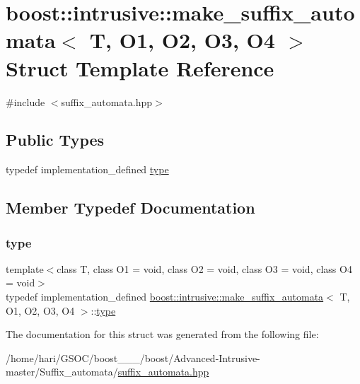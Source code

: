 \hypertarget{structboost_1_1intrusive_1_1make__suffix__automata}{}\section{boost\+:\+:intrusive\+:\+:make\+\_\+suffix\+\_\+automata$<$ T, O1, O2, O3, O4 $>$ Struct Template Reference}
\label{structboost_1_1intrusive_1_1make__suffix__automata}


{\ttfamily \#include $<$suffix\+\_\+automata.\+hpp$>$}

\subsection*{Public Types}
\begin{DoxyCompactItemize}
\item 
typedef implementation\+\_\+defined \hyperlink{structboost_1_1intrusive_1_1make__suffix__automata_a9b173abd26090bafc9d89d6ba31b4165}{type}
\end{DoxyCompactItemize}


\subsection{Member Typedef Documentation}
\mbox{\label{structboost_1_1intrusive_1_1make__suffix__automata_a9b173abd26090bafc9d89d6ba31b4165}} 
\subsubsection{\texorpdfstring{type}{type}}
{\footnotesize\ttfamily template$<$class T, class O1 = void, class O2 = void, class O3 = void, class O4 = void$>$ \\
typedef implementation\+\_\+defined \hyperlink{structboost_1_1intrusive_1_1make__suffix__automata}{boost\+::intrusive\+::make\+\_\+suffix\+\_\+automata}$<$ T, O1, O2, O3, O4 $>$\+::\hyperlink{structboost_1_1intrusive_1_1make__suffix__automata_a9b173abd26090bafc9d89d6ba31b4165}{type}}



The documentation for this struct was generated from the following file\+:\begin{DoxyCompactItemize}
\item 
/home/hari/\+G\+S\+O\+C/boost\+\_\+\_\+\_/boost/\+Advanced-\/\+Intrusive-\/master/\+Suffix\+\_\+automata/\hyperlink{suffix__automata_8hpp}{suffix\+\_\+automata.\+hpp}\end{DoxyCompactItemize}
